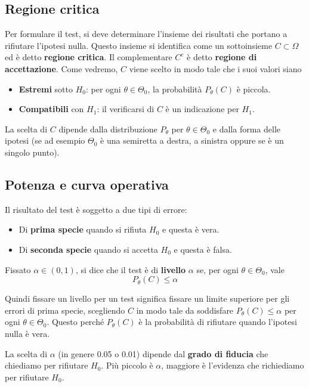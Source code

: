 \subsection{Regione critica}
Per formulare il test, si deve determinare l'insieme dei risultati che portano a rifiutare
l'ipotesi nulla. Questo insieme si identifica come un sottoinsieme $C \subset \Omega$ ed è
detto \textbf{regione critica}. Il complementare $C^c$ è detto \textbf{regione di accettazione}.
Come vedremo, $C$ viene scelto in modo tale che i suoi valori siano
\begin{itemize}
	\item \textbf{Estremi} sotto $H_0$: per ogni $\theta \in \Theta_0$, la probabilità
	      $P_\theta (C)$ è piccola.
	\item \textbf{Compatibili} con $H_1$: il verificarsi di $C$ è un indicazione per $H_1$.
\end{itemize}
La scelta di $C$ dipende dalla distribuzione $P_\theta$ per $\theta \in \Theta_0$ e dalla forma
delle ipotesi (se ad esempio $\Theta_0$ è una semiretta a destra, a sinistra oppure se è un singolo
punto).

\subsection{Potenza e curva operativa}
Il risultato del test è soggetto a due tipi di errore:
\begin{itemize}
	\item Di \textbf{prima specie} quando si rifiuta $H_0$ e questa è vera.
	\item Di \textbf{seconda specie} quando si accetta $H_0$ e questa è falsa.
\end{itemize}

\begin{definition}
	Fissato $\alpha \in (0,1)$, si dice che il test è di \textbf{livello} $\alpha$ se, per ogni
	$\theta \in \Theta_0$, vale
	\[ P_\theta (C) \leq \alpha \]
\end{definition}

Quindi fissare un livello per un test significa fissare un limite superiore per gli errori di
prima specie, scegliendo $C$ in modo tale da soddisfare $P_\theta (C) \leq \alpha$ per ogni
$\theta \in \Theta_0$. Questo perché $P_\theta(C)$ è la probabilità di rifiutare quando l'ipotesi
nulla è vera.

La scelta di $\alpha$ (in genere 0.05 o 0.01) dipende dal \textbf{grado di fiducia} che chiediamo
per rifiutare $H_0$. Più piccolo è $\alpha$, maggiore è l'evidenza che richiediamo per rifiutare
$H_0$.

